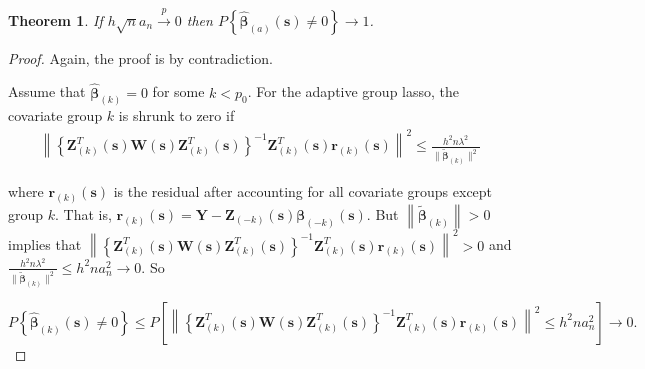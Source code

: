 \documentclass[authoryear, review, 11pt]{elsarticle}
\newtheorem{theorem}{Theorem}[section]
\begin{document}
    \begin{theorem}\label{theorem:selection2}   
        If $h \sqrt{n} a_n \xrightarrow{p} 0$ then $P \left\{ \hat{\bm{\beta}}_{(a)} (\bm{s}) \ne 0 \right\} \to 1$.
    \end{theorem}

    \begin{proof}
        Again, the proof is by contradiction.

        Assume that $\hat{\bm{\beta}}_{(k)} = 0$ for some $k<p_0$. For the adaptive group lasso, the covariate group $k$ is shrunk to zero if 
        \begin{align*}
            \left\| \left\{ \bm{Z}_{(k)}^T(\bm{s}) \bm{W}(\bm{s}) \bm{Z}_{(k)}^T(\bm{s}) \right\}^{-1} \bm{Z}_{(k)}^T(\bm{s}) \bm{r}_{(k)}(\bm{s}) \right\|^2 \le \frac{h^2 n \lambda^2}{ \| \tilde{\bm{\beta}}_{(k)} \|^2 } 
        \end{align*}

        where $\bm{r}_{(k)}(\bm{s})$ is the residual after accounting for all covariate groups except group $k$. That is, $\bm{r}_{(k)}(\bm{s}) = \bm{Y} - \bm{Z}_{(-k)}(\bm{s}) \bm{\beta}_{(-k)}(\bm{s})$. But $\left\| \tilde{\bm{\beta}}_{(k)} \right\| > 0$ implies that $ \left\| \left\{ \bm{Z}_{(k)}^T(\bm{s}) \bm{W}(\bm{s}) \bm{Z}_{(k)}^T(\bm{s}) \right\}^{-1} \bm{Z}_{(k)}^T(\bm{s}) \bm{r}_{(k)}(\bm{s}) \right\|^2 > 0$ and $\frac{h^2 n \lambda^2}{ \| \tilde{\bm{\beta}}_{(k)} \|^2 }  \le h^2 n a_n^2 \to 0$. So

        \begin{equation}
            P \left\{ \hat{\bm{\beta}}_{(k)} (\bm{s}) \ne 0 \right\} \le P \left[ \left\| \left\{ \bm{Z}_{(k)}^T(\bm{s}) \bm{W}(\bm{s}) \bm{Z}_{(k)}^T(\bm{s}) \right\}^{-1} \bm{Z}_{(k)}^T(\bm{s}) \bm{r}_{(k)}(\bm{s}) \right\|^2 \le h^2 n a_n^2 \right] \to 0.
        \end{equation}
        
    \end{proof}
\end{document}
